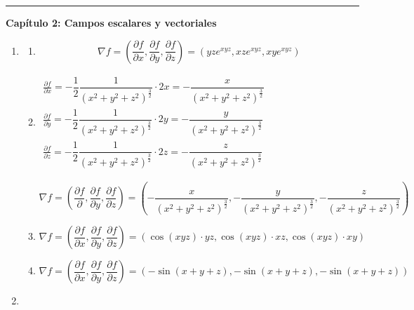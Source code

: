 \begin{center}
  \noindent\rule{0.5\textwidth}{0.5pt}
\end{center}

\textbf{\Large Capítulo 2: Campos escalares y vectoriales}
\begin{enumerate}[label=\color{red}\textbf{\arabic*)}]
  \item {}
    \begin{enumerate}[label=\color{red}\textbf{\alph*)}]
      \item {}
      
      \[
          \nabla f=\left( \frac{\partial f}{\partial x} ,\frac{\partial f}{\partial y} ,\frac{\partial f}{\partial z}  \right) =(yze^{xyz},xze^{xyz},xye^{xyz}   )
          \] 
      \item {} 
      
      $\begin{array}{l}
        \frac{\partial f}{\partial x} =-\dfrac{1}{2}\dfrac{1}{(x^2+y^2+z^2)^{\frac{3}{2}}} \cdot 2x=-\dfrac{x}{(x^2+y^2+z^2)^{\frac{3}{2} }} \\
        \frac{\partial f}{\partial y} =-\dfrac{1}{2}\dfrac{1}{(x^2+y^2+z^2)^{\frac{3}{2}}} \cdot 2y=-\dfrac{y}{(x^2+y^2+z^2)^{\frac{3}{2} }} \\
        \frac{\partial f}{\partial z} =-\dfrac{1}{2}\dfrac{1}{(x^2+y^2+z^2)^{\frac{3}{2}}} \cdot 2z=-\dfrac{z}{(x^2+y^2+z^2)^{\frac{3}{2} }} 
      \end{array}$

      \[
        \nabla f=\left( \frac{\partial f}{\partial }, \frac{\partial f}{\partial y} ,\frac{\partial f}{\partial z}   \right) =\left(-\dfrac{x}{(x^2+y^2+z^2)^{\frac{3}{2} }},-\dfrac{y}{(x^2+y^2+z^2)^{\frac{3}{2} }},-\dfrac{z}{(x^2+y^2+z^2)^{\frac{3}{2} }}\right) 
          \] 
      \item {} 
        \[
        \nabla f=\left( \frac{\partial f}{\partial x} ,\frac{\partial f}{\partial y} ,\frac{\partial f}{\partial z}  \right) =\left( \cos(xyz)\cdot yz,\cos(xyz)\cdot xz,\cos(xyz)\cdot xy \right) 
        \] 
      \item {} 
        \[
        \nabla f=\left( \frac{\partial f}{\partial x} ,\frac{\partial f}{\partial y} ,\frac{\partial f}{\partial z} \right) =(-\sin(x+y+z), -\sin(x+y+z), -\sin(x+y+z))
        \] 
    \end{enumerate}
  \item {}


\end{enumerate}
